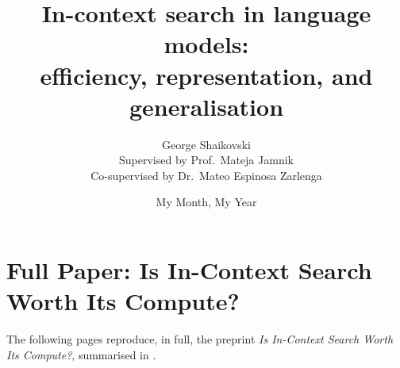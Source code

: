 \documentclass[firstyr,withindex]{cam-thesis}
\title{In-context search in language models:\\
efficiency, representation, and generalisation}
\author{George Shaikovski\\[1ex]{\normalsize Supervised by Prof.\ Mateja Jamnik}\\[1ex]{\normalsize Co-supervised by Dr.\ Mateo Espinosa Zarlenga}}
\date{My Month, My Year}
\begin{document}
\frontmatter{}










%

\renewcommand{\bibname}{References}
\cleardoublepage
{}
{}






\appendix
{}

\chapter{Full Paper: Is In-Context Search Worth Its Compute?}
\label{app:paper}
The following pages reproduce, in full, the preprint \textit{Is In-Context Search Worth Its Compute?}, summarised in .



\printthesisindex
\end{document}
